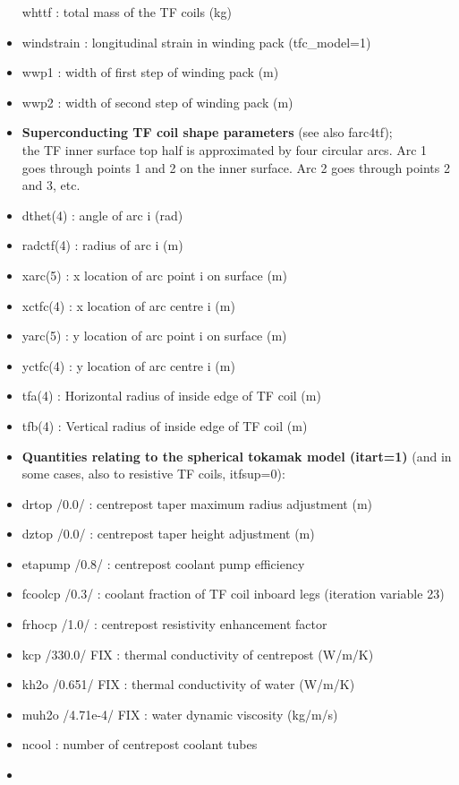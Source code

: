 \documentclass[]{article}
\begin{document}
\begin{itemize}
  whttf : total mass of the TF coils (kg)
\item
  windstrain : longitudinal strain in winding pack (tfc\_model=1)
\item
  wwp1 : width of first step of winding pack (m)
\item
  wwp2 : width of second step of winding pack (m)
\item
  \textbf{Superconducting TF coil shape parameters} (see also farc4tf);
  \\the TF inner surface top half is approximated by four circular arcs.
  Arc 1 goes through points 1 and 2 on the inner surface. Arc 2 goes
  through points 2 and 3, etc.
\item
  dthet(4) : angle of arc i (rad)
\item
  radctf(4) : radius of arc i (m)
\item
  xarc(5) : x location of arc point i on surface (m)
\item
  xctfc(4) : x location of arc centre i (m)
\item
  yarc(5) : y location of arc point i on surface (m)
\item
  yctfc(4) : y location of arc centre i (m)
\item
  tfa(4) : Horizontal radius of inside edge of TF coil (m)
\item
  tfb(4) : Vertical radius of inside edge of TF coil (m)
\item
  \textbf{Quantities relating to the spherical tokamak model (itart=1)}
  (and in some cases, also to resistive TF coils, itfsup=0):
\item
  drtop /0.0/ : centrepost taper maximum radius adjustment (m)
\item
  dztop /0.0/ : centrepost taper height adjustment (m)
\item
  etapump /0.8/ : centrepost coolant pump efficiency
\item
  fcoolcp /0.3/ : coolant fraction of TF coil inboard legs (iteration
  variable 23)
\item
  frhocp /1.0/ : centrepost resistivity enhancement factor
\item
  kcp /330.0/ FIX : thermal conductivity of centrepost (W/m/K)
\item
  kh2o /0.651/ FIX : thermal conductivity of water (W/m/K)
\item
  muh2o /4.71e-4/ FIX : water dynamic viscosity (kg/m/s)
\item
  ncool : number of centrepost coolant tubes
\item

\end{itemize}
\end{document}
